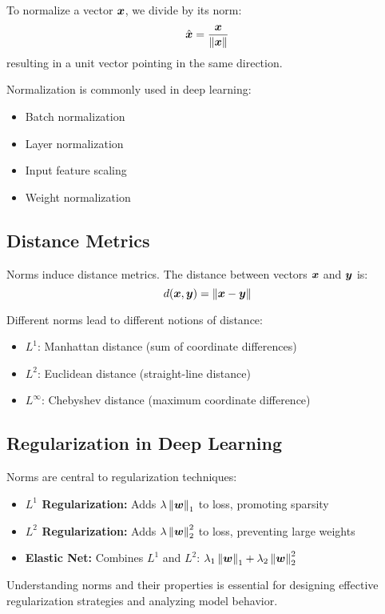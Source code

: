 \begin{definition}[Normalization]
To normalize a vector $\boldsymbol{x}$, we divide by its norm:
\begin{equation}
    \hat{\boldsymbol{x}} = \frac{\boldsymbol{x}}{\left\lVert\boldsymbol{x}\right\rVert}
\end{equation}
resulting in a unit vector pointing in the same direction.
\end{definition}

Normalization is commonly used in deep learning:
\begin{itemize}
    \item Batch normalization
    \item Layer normalization
    \item Input feature scaling
    \item Weight normalization
\end{itemize}

\subsection{Distance Metrics}

Norms induce distance metrics. The distance between vectors $\boldsymbol{x}$ and $\boldsymbol{y}$ is:
\begin{equation}
    d(\boldsymbol{x}, \boldsymbol{y}) = \left\lVert\boldsymbol{x} - \boldsymbol{y}\right\rVert
\end{equation}

Different norms lead to different notions of distance:
\begin{itemize}
    \item $L^1$: Manhattan distance (sum of coordinate differences)
    \item $L^2$: Euclidean distance (straight-line distance)
    \item $L^\infty$: Chebyshev distance (maximum coordinate difference)
\end{itemize}

\subsection{Regularization in Deep Learning}

Norms are central to regularization techniques:

\begin{itemize}
    \item \textbf{$L^1$ Regularization:} Adds $\lambda\left\lVert\boldsymbol{w}\right\rVert_1$ to loss, promoting sparsity
    \item \textbf{$L^2$ Regularization:} Adds $\lambda\left\lVert\boldsymbol{w}\right\rVert_2^2$ to loss, preventing large weights
    \item \textbf{Elastic Net:} Combines $L^1$ and $L^2$: $\lambda_1\left\lVert\boldsymbol{w}\right\rVert_1 + \lambda_2\left\lVert\boldsymbol{w}\right\rVert_2^2$
\end{itemize}

Understanding norms and their properties is essential for designing effective regularization strategies and analyzing model behavior.
